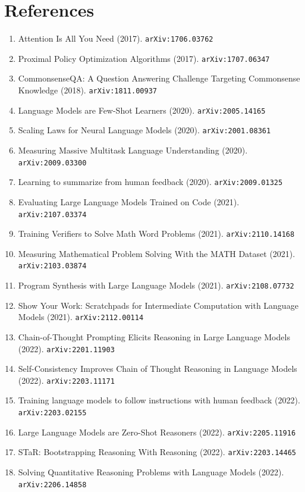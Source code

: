 \documentclass[11pt]{article}
\begin{document}
\section*{References}
\begin{enumerate}\small
  \item Attention Is All You Need (2017). \texttt{arXiv:1706.03762}
  \item Proximal Policy Optimization Algorithms (2017). \texttt{arXiv:1707.06347}
  \item CommonsenseQA: A Question Answering Challenge Targeting Commonsense
  Knowledge (2018). \texttt{arXiv:1811.00937}
  \item Language Models are Few-Shot Learners (2020). \texttt{arXiv:2005.14165}
  \item Scaling Laws for Neural Language Models (2020). \texttt{arXiv:2001.08361}
  \item Measuring Massive Multitask Language Understanding (2020). \texttt{arXiv:2009.03300}
  \item Learning to summarize from human feedback (2020). \texttt{arXiv:2009.01325}
  \item Evaluating Large Language Models Trained on Code (2021). \texttt{arXiv:2107.03374}
  \item Training Verifiers to Solve Math Word Problems (2021). \texttt{arXiv:2110.14168}
  \item Measuring Mathematical Problem Solving With the MATH Dataset (2021). \texttt{arXiv:2103.03874}
  \item Program Synthesis with Large Language Models (2021). \texttt{arXiv:2108.07732}
  \item Show Your Work: Scratchpads for Intermediate Computation with Language
  Models (2021). \texttt{arXiv:2112.00114}
  \item Chain-of-Thought Prompting Elicits Reasoning in Large Language Models (2022). \texttt{arXiv:2201.11903}
  \item Self-Consistency Improves Chain of Thought Reasoning in Language Models (2022). \texttt{arXiv:2203.11171}
  \item Training language models to follow instructions with human feedback (2022). \texttt{arXiv:2203.02155}
  \item Large Language Models are Zero-Shot Reasoners (2022). \texttt{arXiv:2205.11916}
  \item STaR: Bootstrapping Reasoning With Reasoning (2022). \texttt{arXiv:2203.14465}
  \item Solving Quantitative Reasoning Problems with Language Models (2022). \texttt{arXiv:2206.14858}

\end{enumerate}
\end{document}
